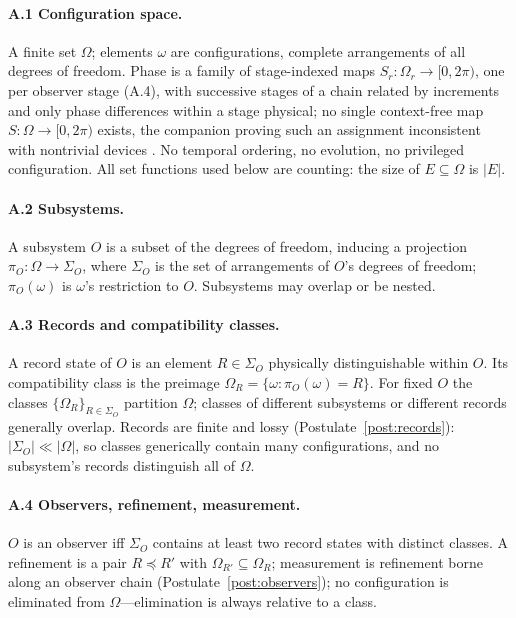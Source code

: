\documentclass[11pt]{article}
\theoremstyle{definition}
\theoremstyle{remark}
\begin{document}
\paragraph{A.1 Configuration space.} A finite set $\Omega$; elements $\omega$ are configurations, complete arrangements of all degrees of freedom. Phase is a family of stage-indexed maps $S_r : \Omega_r \to [0, 2\pi)$, one per observer stage (A.4), with successive stages of a chain related by increments and only phase differences within a stage physical; no single context-free map $S : \Omega \to [0,2\pi)$ exists, the companion proving such an assignment inconsistent with nontrivial devices \cite{TillittBorn}. No temporal ordering, no evolution, no privileged configuration. All set functions used below are counting: the size of $E \subseteq \Omega$ is $|E|$.

\paragraph{A.2 Subsystems.} A subsystem $O$ is a subset of the degrees of freedom, inducing a projection $\pi_O : \Omega \to \Sigma_O$, where $\Sigma_O$ is the set of arrangements of $O$'s degrees of freedom; $\pi_O(\omega)$ is $\omega$'s restriction to $O$. Subsystems may overlap or be nested.

\paragraph{A.3 Records and compatibility classes.} A record state of $O$ is an element $R \in \Sigma_O$ physically distinguishable within $O$. Its compatibility class is the preimage $\Omega_R = \{\omega : \pi_O(\omega) = R\}$. For fixed $O$ the classes $\{\Omega_R\}_{R \in \Sigma_O}$ partition $\Omega$; classes of different subsystems or different records generally overlap. Records are finite and lossy (Postulate~\ref{post:records}): $|\Sigma_O| \ll |\Omega|$, so classes generically contain many configurations, and no subsystem's records distinguish all of $\Omega$.

\paragraph{A.4 Observers, refinement, measurement.} $O$ is an observer iff $\Sigma_O$ contains at least two record states with distinct classes. A refinement is a pair $R \preceq R'$ with $\Omega_{R'} \subseteq \Omega_R$; measurement is refinement borne along an observer chain (Postulate~\ref{post:observers}); no configuration is eliminated from $\Omega$---elimination is always relative to a class.
\end{document}
